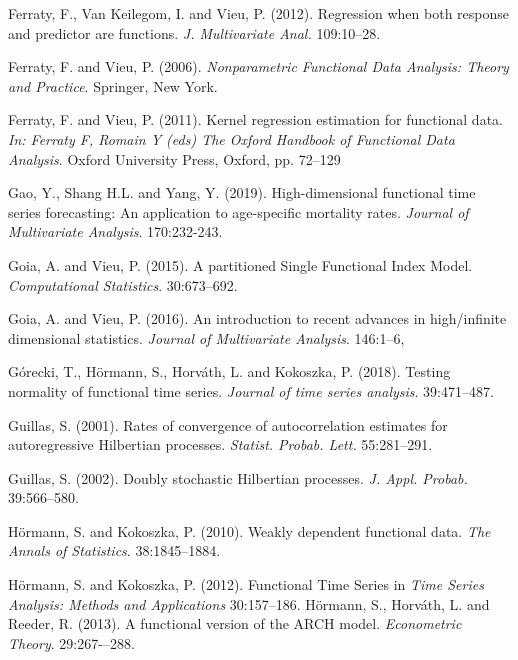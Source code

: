 \documentclass[11pt,a4paper]{article}
\begin{document}
\begin{thebibliography}{9}
	Ferraty, F., Van Keilegom, I.  and Vieu, P. (2012).
Regression when both response and predictor are functions.
\emph{J. Multivariate Anal.} 109:10--28.



Ferraty, F. and Vieu, P. (2006). \emph{Nonparametric Functional Data Analysis: Theory and Practice}.  Springer, New York.


Ferraty, F. and Vieu, P. (2011). Kernel regression estimation for functional data. \emph{In: Ferraty F, Romain Y (eds) The Oxford Handbook of Functional Data Analysis}.  Oxford University Press, Oxford, pp. 72--129



Gao, Y., Shang H.L. and Yang, Y. (2019). High-dimensional functional time series forecasting: An application to age-specific mortality rates.
\emph{Journal of Multivariate Analysis}. 170:232-243.

Goia, A. and Vieu, P. (2015). A partitioned Single Functional Index Model. \emph{Computational Statistics}. 30:673--692.

Goia, A. and Vieu, P. (2016). An introduction to recent advances in high/infinite dimensional statistics. \emph{Journal of Multivariate Analysis}. 146:1--6,

G\'orecki, T., H\"ormann, S., Horv\'ath, L. and Kokoszka, P. (2018). Testing normality of functional time series. \emph{Journal of time series analysis}. 39:471--487.

 Guillas, S. (2001).
	Rates of convergence of autocorrelation estimates for
autoregressive Hilbertian processes.
	\emph{Statist. Probab. Lett.}
	55:281--291.

 Guillas, S. (2002).
	Doubly stochastic {H}ilbertian processes.
	\emph{J. Appl. Probab.} 39:566--580.
		
H\"{o}rmann, S. and Kokoszka, P. (2010). Weakly dependent functional data. \emph{The Annals of Statistics}. 38:1845--1884.

 H{\"o}rmann, S. and  Kokoszka, P. (2012).
	Functional {T}ime {S}eries
	in \emph{Time Series Analysis: Methods and Applications} 30:157--186.
H\"ormann, S., Horv\'ath, L. and Reeder, R. (2013). A functional version of the ARCH model. \emph{Econometric Theory}. 29:267-–288.



\end{thebibliography}
\end{document}

